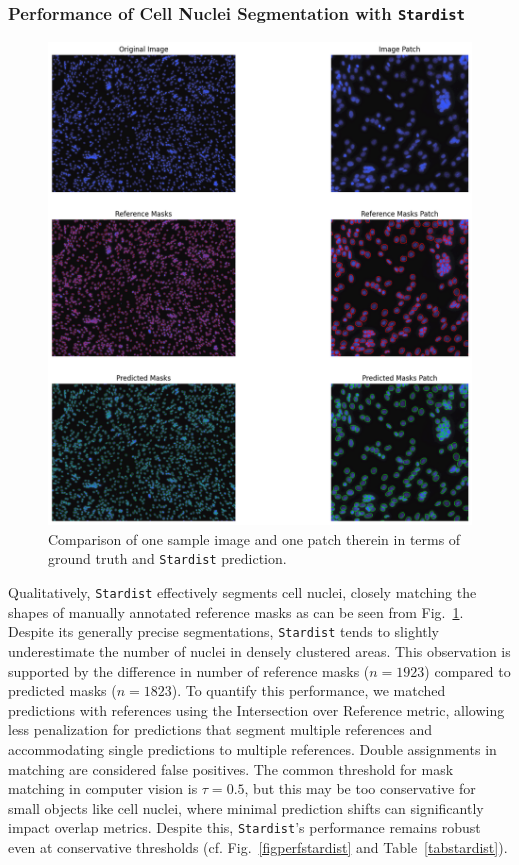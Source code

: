 \subsubsection{Performance of Cell Nuclei Segmentation with \texttt{Stardist}}

\begin{figure}
	\centering
	\includegraphics[width=\textwidth]{"images/qualitative_performance_stardist.png"}
	\caption[Qualitative performance \texttt{Stardist}]{Comparison of one sample image and one patch therein in terms of ground truth and \texttt{Stardist} prediction.}
	\label{figperfstardistqual}
\end{figure} 

Qualitatively, \texttt{Stardist} effectively segments cell nuclei, closely matching the shapes of manually annotated reference masks as can be seen from Fig.~\ref{figperfstardistqual}. Despite its generally precise segmentations, \texttt{Stardist} tends to slightly underestimate the number of nuclei in densely clustered areas. This observation is supported by the difference in number of reference masks ($n=1923$) compared to predicted masks ($n=1823$). To quantify this performance, we matched predictions with references using the Intersection over Reference metric, allowing less penalization for predictions that segment multiple references and accommodating single predictions to multiple references. Double assignments in matching are considered false positives.
The common threshold for mask matching in computer vision is $\tau = 0.5$, but this may be too conservative for small objects like cell nuclei, where minimal prediction shifts can significantly impact overlap metrics. Despite this, \texttt{Stardist}'s performance remains robust even at conservative thresholds (cf. Fig.~\ref{figperfstardist} and Table~\ref{tabstardist}).


